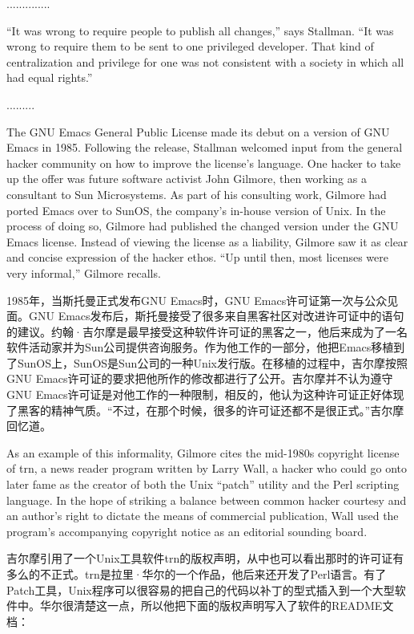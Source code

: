 \ifdefined\chs
..............
\fi

\ifdefined\eng
``It was wrong to require people to publish all changes,'' says Stallman. ``It was wrong to require them to be sent to one privileged developer. That kind of centralization and privilege for one was not consistent with a society in which all had equal rights.''
\fi

\ifdefined\chs
.........
\fi

\ifdefined\eng
The GNU Emacs General Public License made its debut on a version of GNU Emacs in 1985. Following the release, Stallman welcomed input from the general hacker community on how to improve the license's language. One hacker to take up the offer was future software activist John Gilmore, then working as a consultant to Sun Microsystems. As part of his consulting work, Gilmore had ported Emacs over to SunOS, the company's in-house version of Unix. In the process of doing so, Gilmore had published the changed version under the GNU Emacs license. Instead of viewing the license as a liability, Gilmore saw it as clear and concise expression of the hacker ethos. ``Up until then, most licenses were very informal,'' Gilmore recalls.
\fi

\ifdefined\chs
1985年，当斯托曼正式发布GNU Emacs时，GNU Emacs许可证第一次与公众见面。GNU Emacs发布后，斯托曼接受了很多来自黑客社区对改进许可证中的语句的建议。约翰·吉尔摩是最早接受这种软件许可证的黑客之一，他后来成为了一名软件活动家并为Sun公司提供咨询服务。作为他工作的一部分，他把Emacs移植到了SunOS上，SunOS是Sun公司的一种Unix发行版。在移植的过程中，吉尔摩按照GNU Emacs许可证的要求把他所作的修改都进行了公开。吉尔摩并不认为遵守GNU Emacs许可证是对他工作的一种限制，相反的，他认为这种许可证正好体现了黑客的精神气质。“不过，在那个时候，很多的许可证还都不是很正式。”吉尔摩回忆道。
\fi

\ifdefined\eng
As an example of this informality, Gilmore cites the mid-1980s copyright license of trn, a news reader program written by Larry Wall, a hacker who could go onto later fame as the creator of both the Unix ``patch'' utility and the Perl scripting language. In the hope of striking a balance between common hacker courtesy and an author's right to dictate the means of commercial publication, Wall used the program's accompanying copyright notice as an editorial sounding board.
\fi

\ifdefined\chs
吉尔摩引用了一个Unix工具软件trn的版权声明，从中也可以看出那时的许可证有多么的不正式。trn是拉里·华尔的一个作品，他后来还开发了Perl语言。有了Patch工具，Unix程序可以很容易的把自己的代码以补丁的型式插入到一个大型软件中。华尔很清楚这一点，所以他把下面的版权声明写入了软件的README文档：
\fi

